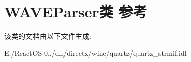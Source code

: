 \hypertarget{class_w_a_v_e_parser}{}\section{W\+A\+V\+E\+Parser类 参考}
\label{class_w_a_v_e_parser}


该类的文档由以下文件生成\+:\begin{DoxyCompactItemize}
\item 
E\+:/\+React\+O\+S-\/0../dll/directx/wine/quartz/quartz\+\_\+strmif.\+idl\end{DoxyCompactItemize}

